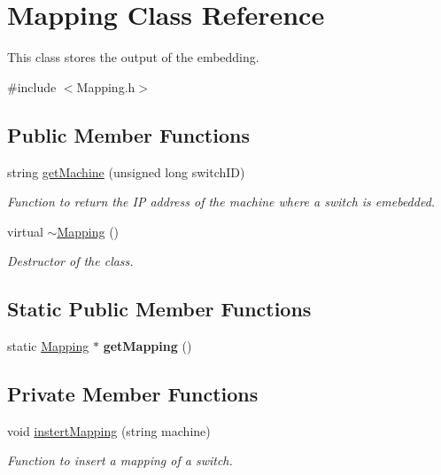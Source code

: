 \hypertarget{classMapping}{\section{\-Mapping \-Class \-Reference}
\label{classMapping}
}


\-This class stores the output of the embedding.  




{\ttfamily \#include $<$\-Mapping.\-h$>$}

\subsection*{\-Public \-Member \-Functions}
\begin{DoxyCompactItemize}
\item 
string \hyperlink{classMapping_a10bd9ef00210b8fbc255ea0c271f4117}{get\-Machine} (unsigned long switch\-I\-D)
\begin{DoxyCompactList}\small\item\em \-Function to return the \-I\-P address of the machine where a switch is emebedded. \end{DoxyCompactList}\item 
\hypertarget{classMapping_acb71f5ef0bcc6fdc4563b76fd2fd86ec}{virtual \hyperlink{classMapping_acb71f5ef0bcc6fdc4563b76fd2fd86ec}{$\sim$\-Mapping} ()}\label{classMapping_acb71f5ef0bcc6fdc4563b76fd2fd86ec}

\begin{DoxyCompactList}\small\item\em \-Destructor of the class. \end{DoxyCompactList}\end{DoxyCompactItemize}
\subsection*{\-Static \-Public \-Member \-Functions}
\begin{DoxyCompactItemize}
\item 
\hypertarget{classMapping_a63058edd4eaf5c4d3a8cab2c648922b2}{static \hyperlink{classMapping}{\-Mapping} $\ast$ {\bfseries get\-Mapping} ()}\label{classMapping_a63058edd4eaf5c4d3a8cab2c648922b2}

\end{DoxyCompactItemize}
\subsection*{\-Private \-Member \-Functions}
\begin{DoxyCompactItemize}
\item 
void \hyperlink{classMapping_a880ae1293c5efebdeee98ec972a17a96}{instert\-Mapping} (string machine)
\begin{DoxyCompactList}\small\item\em \-Function to insert a mapping of a switch. \end{DoxyCompactList}\end{DoxyCompactItemize}
